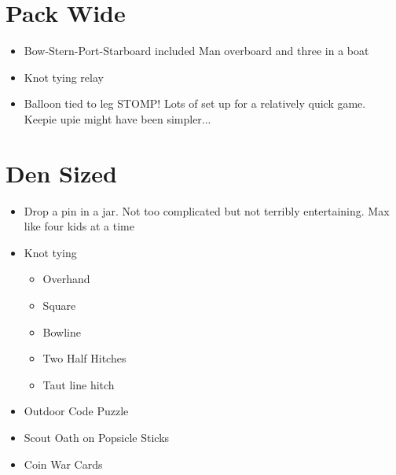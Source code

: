 \documentclass{exam}
\begin{document}
\section{Pack Wide}
\begin{itemize}
\item Bow-Stern-Port-Starboard included Man overboard and three in a boat
\item Knot tying relay
\item Balloon tied to leg STOMP!  Lots of set up for a relatively quick game.  Keepie upie might have been simpler...
\end{itemize}
\section{Den Sized}
\begin{itemize}
\item Drop a pin in a jar.  Not too complicated but not terribly entertaining.  Max like four kids at a time
\item Knot tying
\begin{itemize}
\item Overhand
\item Square
\item Bowline
\item Two Half Hitches
\item Taut line hitch
\end{itemize}
\item Outdoor Code Puzzle
\item Scout Oath on Popsicle Sticks
\item Coin War Cards
\end{itemize}
\end{document}
